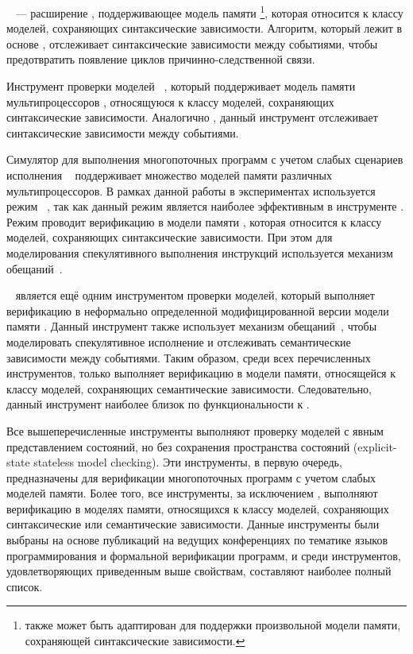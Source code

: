 \textbf{\hmc}~\cite{Kokologiannakis-Vafeiadis:ASPLOS2020} --- 
расширение \genmc, поддерживающее модель памяти \IMM
\footnote{\hmc также может быть адаптирован для поддержки 
  произвольной модели памяти, сохраняющей синтаксические зависимости.},
которая относится к классу моделей, сохраняющих синтаксические зависимости.  
Алгоритм, который лежит в основе \hmc, отслеживает синтаксические зависимости между событиями, 
чтобы предотвратить появление циклов причинно-следственной связи. 

Инструмент проверки моделей \textbf{\Nidhugg}~\cite{Abdulla-al:TACAS2015,Abdulla-al:CAV2016}, который поддерживает модель памяти мультипроцессоров \POWER, 
относящуюся к классу моделей, сохраняющих синтаксические зависимости.  
Аналогично \hmc, данный инструмент отслеживает синтаксические зависимости между событиями.

Симулятор для выполнения многопоточных программ с учетом слабых сценариев исполнения \textbf{\rmem}~\cite{RMEM} поддерживает множество моделей памяти различных мультипроцессоров. 
В рамках данной работы в экспериментах используется режим \PrmARM%
~\cite{Pulte-al:PLDI2019}, так как данный режим является 
наиболее эффективным в инструменте \rmem.
Режим \PrmARM проводит верификацию в модели памяти , 
которая относится к классу моделей, сохраняющих синтаксические зависимости. 
При этом для моделирования спекулятивного выполнения инструкций 
используется механизм обещаний~\cite{Kang-al:POPL17}.  

\textbf{\CDSChecker}~\cite{Norris-Demsky:OOPSLA2013} является 
ещё одним инструментом проверки моделей, который выполняет  верификацию 
в неформально определенной модифицированной версии модели памяти \CMM.
Данный инструмент также использует механизм обещаний~\cite{Kang-al:POPL17}, 
чтобы моделировать спекулятивное исполнение и отслеживать
семантические зависимости между событиями. 
Таким образом, среди всех перечисленных инструментов,
только \CDSChecker выполняет верификацию в модели памяти, 
относящейся к классу моделей, сохраняющих семантические зависимости. 
Следовательно, данный инструмент наиболее близок по функциональности к \wmc.

Все вышеперечисленные инструменты выполняют проверку 
моделей с явным представлением состояний, 
но без сохранения пространства состояний (explicit-state stateless model checking). 
Эти инструменты, в первую очередь, предназначены 
для верификации многопоточных программ с учетом слабых моделей памяти. 
Более того, все инструменты, за исключением \genmc, выполняют верификацию 
в моделях памяти, относящихся к классу моделей, 
сохраняющих синтаксические или семантические зависимости. 
Данные инструменты были выбраны на основе публикаций 
на ведущих конференциях по тематике языков программирования 
и формальной верификации программ, и среди инструментов, 
удовлетворяющих приведенным выше свойствам, 
составляют наиболее полный список.


